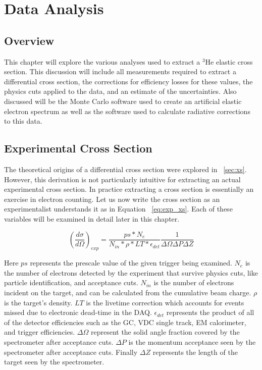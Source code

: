 \chapter{Data Analysis} %
\label{ch:analysis}

\section{Overview}
\label{sec:analysis_overview}

This chapter will explore the various analyses used to extract a $^3$He elastic cross section. This discussion will include all measurements required to extract a differential cross section, the corrections for efficiency losses for these values, the physics cuts applied to the data, and an estimate of the uncertainties. Also discussed will be the Monte Carlo software used to create an artificial elastic electron spectrum as well as the software used to calculate radiative corrections to this data.

\section{Experimental Cross Section}
\label{sec:exp_xs}

The theoretical origins of a differential cross section were explored in ~\ref{sec:xs}. However, this derivation is not particularly intuitive for extracting an actual experimental cross section. In practice extracting a cross section is essentially an exercise in electron counting. Let us now write the cross section as an experimentalist understands it as in Equation ~\ref{eq:exp_xs}. Each of these variables will be examined in detail later in this chapter.

\begin{equation} \label{eq:exp_xs}
	\left(\frac{d\sigma}{d\Omega}\right)_{exp} = \frac{ps*N_e}{N_{in}*\rho *LT* \epsilon_{det}} \frac{1}{\Delta\Omega\Delta P \Delta Z}
\end{equation}

Here $ps$ represents the prescale value of the given trigger being examined. $N_e$ is the number of electrons detected by the experiment that survive physics cuts, like particle identification, and acceptance cuts. $N_{in}$ is the number of electrons incident on the target, and can be calculated from the cumulative beam charge. $\rho$ is the target's density. $LT$ is the livetime correction which accounts for events missed due to electronic dead-time in the DAQ. $\epsilon_{det}$ represents the product of all of the detector efficiencies such as the GC, VDC single track, EM calorimeter, and trigger efficiencies. $\Delta\Omega$ represent the solid angle fraction covered by the spectrometer after acceptance cuts. $\Delta P$ is the momentum acceptance seen by the spectrometer after acceptance cuts. Finally $\Delta Z$ represents the length of the target seen by the spectrometer.

